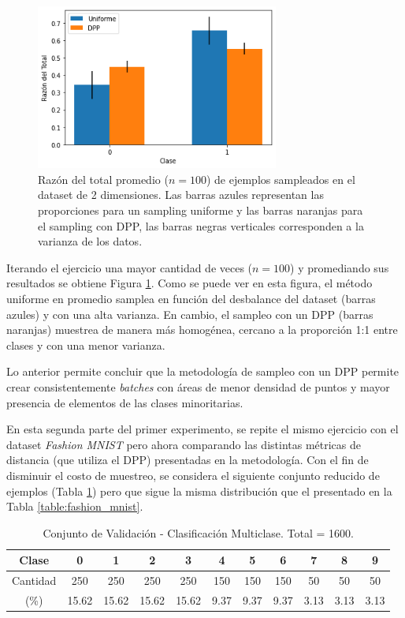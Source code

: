 \begin{figure}[ht]
    \centering
    \includegraphics[width=8cm]{img/tesis/resultados/sampling_n_2.png}
    \caption{Razón del total promedio ($n=100$) de ejemplos sampleados en el dataset de 2 dimensiones. Las barras azules representan las proporciones para un sampling uniforme y las barras naranjas para el sampling con DPP, las barras negras verticales corresponden a la varianza de los datos.}
    \label{fig:proporcion_sampling}
\end{figure}

Iterando el ejercicio una mayor cantidad de veces ($n=100$) y promediando sus resultados se obtiene Figura \ref{fig:proporcion_sampling}. Como se puede ver en esta figura, el método uniforme en promedio samplea en función del desbalance del dataset (barras azules) y con una alta varianza. En cambio, el sampleo con un DPP (barras naranjas) muestrea de manera más homogénea, cercano a la proporción 1:1 entre clases y con una menor varianza. 

\vspace{0.2cm}

Lo anterior permite concluir que la metodología de sampleo con un DPP permite crear consistentemente \textit{batches} con áreas de menor densidad de puntos y mayor presencia de elementos de las clases minoritarias. 

\vspace{0.2cm}

En esta segunda parte del primer experimento, se repite el mismo ejercicio con el dataset \textit{Fashion MNIST} pero ahora comparando las distintas métricas de distancia (que utiliza el DPP) presentadas en la metodología. Con el fin de disminuir el costo de muestreo, se considera el siguiente conjunto reducido de ejemplos (Tabla \ref{table:fashion_mnist_val}) pero que sigue la misma distribución que el presentado en la Tabla \ref{table:fashion_mnist}.

\begin{table}[ht]
\begin{tabular}{|c|c|c|c|c|c|c|c|c|c|c|}
\hline
Clase    & 0    & 1    & 2    & 3    & 4    & 5    & 6   & 7   & 8   & 9   \\ \hline
Cantidad & 250 & 250 & 250 & 250 & 150 & 150 & 150 & 50 & 50 & 50 \\ \hline
(\%) & 15.62 & 15.62 & 15.62 & 15.62 & 9.37 & 9.37 & 9.37 & 3.13 & 3.13 & 3.13 \\ \hline
\end{tabular}
\caption{Conjunto de Validación - Clasificación Multiclase. Total = 1600.}
\label{table:fashion_mnist_val}
\end{table}

